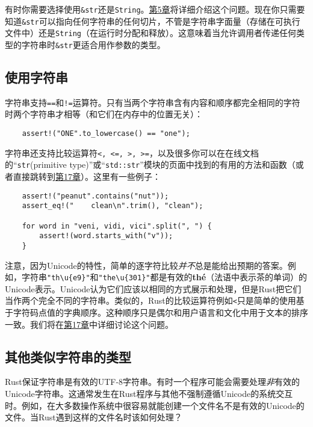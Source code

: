 有时你需要选择使用\texttt{\&str}还是\texttt{String}。\hyperref[ch05]{第5章}将详细介绍这个问题。现在你只需要知道\texttt{\&str}可以指向任何字符串的任何切片，不管是字符串字面量（存储在可执行文件中）还是\texttt{String}（在运行时分配和释放）。这意味着当允许调用者传递任何类型的字符串时\texttt{\&str}更适合用作参数的类型。

\subsection{使用字符串}

字符串支持\texttt{==}和\texttt{!=}运算符。只有当两个字符串含有内容和顺序都完全相同的字符时两个字符串才相等（和它们在内存中的位置无关）：
\begin{verbatim}
    assert!("ONE".to_lowercase() == "one");
\end{verbatim}

字符串还支持比较运算符\texttt{<, <=, >, >=}，以及很多你可以在在线文档的“\texttt{str}(primitive type)”或“\texttt{std::str}”模块的页面中找到的有用的方法和函数（或者直接跳转到\hyperref[ch17]{第17章}）。这里有一些例子：
\begin{verbatim}
    assert!("peanut".contains("nut"));
    assert_eq!("    clean\n".trim(), "clean");

    for word in "veni, vidi, vici".split(", ") {
        assert!(word.starts_with("v"));
    }
\end{verbatim}

注意，因为Unicode的特性，简单的逐字符比较\emph{并不}总是能给出预期的答案。例如，字符串\texttt{"th\textbackslash{}u\{e9\}"}和\texttt{"the\textbackslash{}u\{301\}"}都是有效的\textbf{thé}（法语中表示茶的单词）的Unicode表示。Unicode认为它们应该以相同的方式展示和处理，但是Rust把它们当作两个完全不同的字符串。类似的，Rust的比较运算符例如\texttt{<}只是简单的使用基于字符码点值的字典顺序。这种顺序只是偶尔和用户语言和文化中用于文本的排序一致。我们将在\hyperref[ch17]{第17章}中详细讨论这个问题。

\subsection{其他类似字符串的类型}

Rust保证字符串是有效的UTF-8字符串。有时一个程序可能会需要处理\emph{非}有效的Unicode字符串。这通常发生在Rust程序与其他不强制遵循Unicode的系统交互时。例如，在大多数操作系统中很容易就能创建一个文件名不是有效的Unicode的文件。当Rust遇到这样的文件名时该如何处理？

